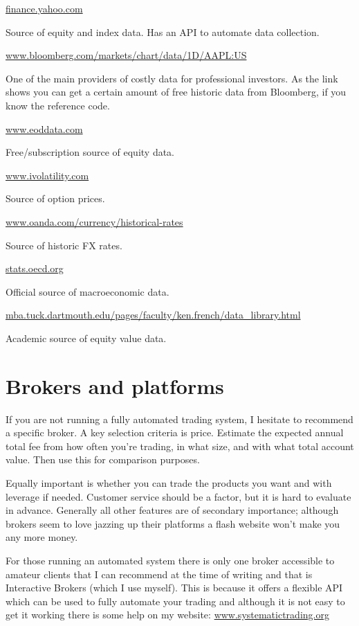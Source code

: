 \url{finance.yahoo.com}

Source of equity and index data. Has an API to automate data collection.

\url{www.bloomberg.com/markets/chart/data/1D/AAPL:US}

One of the main providers of costly data for professional investors. As the link shows you can get a certain amount of free historic data from Bloomberg, if you know the reference code.

\url{www.eoddata.com}

Free/subscription source of equity data.

\url{www.ivolatility.com}

Source of option prices.

\url{www.oanda.com/currency/historical-rates}

Source of historic FX rates.

\url{stats.oecd.org}

Official source of macroeconomic data.

\url{mba.tuck.dartmouth.edu/pages/faculty/ken.french/data_library.html}

Academic source of equity value data.

\section*{Brokers and platforms}  {}

If you are not running a fully automated trading system, I hesitate to recommend a specific broker. A key selection criteria is price. Estimate the expected annual total fee from how often you're trading, in what size, and with what total account value. Then use this for comparison purposes.

Equally important is whether you can trade the products you want and with leverage if needed. Customer service should be a factor, but it is hard to evaluate in advance. Generally all other features are of secondary importance; although brokers seem to love jazzing up their platforms a flash website won't make you any more money.

For those running an automated system there is only one broker accessible to amateur clients that I can recommend at the time of writing and that is Interactive Brokers (which I use myself). This is because it offers a flexible API which can be used to fully automate your trading and although it is not easy to get it working there is some help on my website: \url{www.systematictrading.org}

